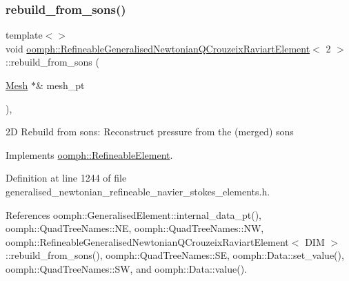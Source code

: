 \subsubsection{\texorpdfstring{rebuild\+\_\+from\+\_\+sons()}{rebuild\_from\_sons()}\hspace{0.1cm}{\footnotesize\ttfamily [2/3]}}
{\footnotesize\ttfamily template$<$$>$ \\
void \hyperlink{classoomph_1_1RefineableGeneralisedNewtonianQCrouzeixRaviartElement}{oomph\+::\+Refineable\+Generalised\+Newtonian\+Q\+Crouzeix\+Raviart\+Element}$<$ 2 $>$\+::rebuild\+\_\+from\+\_\+sons (\begin{DoxyParamCaption}\item[{\hyperlink{classoomph_1_1Mesh}{Mesh} $\ast$\&}]{mesh\+\_\+pt }\end{DoxyParamCaption})\hspace{0.3cm}{\ttfamily [inline]}, {\ttfamily [virtual]}}



2D Rebuild from sons\+: Reconstruct pressure from the (merged) sons 



Implements \hyperlink{classoomph_1_1RefineableElement_a33324be27833fa4b78279d17158215fa}{oomph\+::\+Refineable\+Element}.



Definition at line 1244 of file generalised\+\_\+newtonian\+\_\+refineable\+\_\+navier\+\_\+stokes\+\_\+elements.\+h.



References oomph\+::\+Generalised\+Element\+::internal\+\_\+data\+\_\+pt(), oomph\+::\+Quad\+Tree\+Names\+::\+NE, oomph\+::\+Quad\+Tree\+Names\+::\+NW, oomph\+::\+Refineable\+Generalised\+Newtonian\+Q\+Crouzeix\+Raviart\+Element$<$ D\+I\+M $>$\+::rebuild\+\_\+from\+\_\+sons(), oomph\+::\+Quad\+Tree\+Names\+::\+SE, oomph\+::\+Data\+::set\+\_\+value(), oomph\+::\+Quad\+Tree\+Names\+::\+SW, and oomph\+::\+Data\+::value().

\mbox{\label{classoomph_1_1RefineableGeneralisedNewtonianQCrouzeixRaviartElement_ab52f6e7dbb9ddcd739af537607ef1d1a}} 
